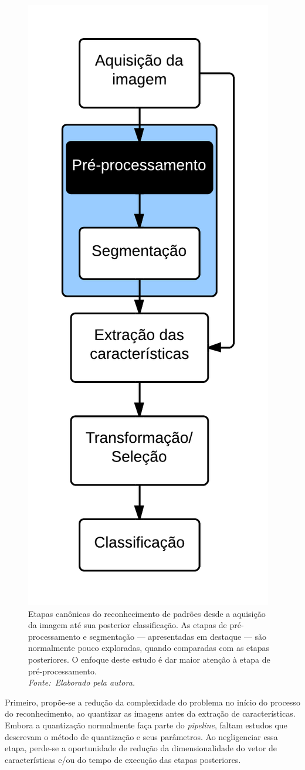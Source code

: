 \begin{figure}[!htbp]
 \begin{center}
   \includegraphics[width=0.3\linewidth]{figuras/flow.png}
 \end{center}
 \caption[Etapas canônicas do reconhecimento de padrões desde a aquisição da imagem até sua posterior classificação. As etapas de pré-processamento e segmentação --- apresentadas em destaque --- são normalmente pouco exploradas, quando comparadas com as etapas posteriores. O enfoque deste estudo é dar maior atenção à etapa de pré-processamento.]{Etapas canônicas do reconhecimento de padrões desde a aquisição da imagem até sua posterior classificação. As etapas de pré-processamento e segmentação --- apresentadas em destaque --- são normalmente pouco exploradas, quando comparadas com as etapas posteriores. O enfoque deste estudo é dar maior atenção à etapa de pré-processamento. \\ \textit{Fonte:~Elaborado pela autora.}}
 \label{fig:etapascanonicas}
\end{figure}

Primeiro, propõe-se a redução da complexidade do problema no início do processo do reconhecimento, ao quantizar as imagens antes da extração de características. Embora a quantização normalmente faça parte do \textit{pipeline}, faltam estudos que descrevam o método de quantização e seus parâmetros. Ao negligenciar essa etapa, perde-se a oportunidade de redução da dimensionalidade do vetor de características e/ou do tempo de execução das etapas posteriores.

